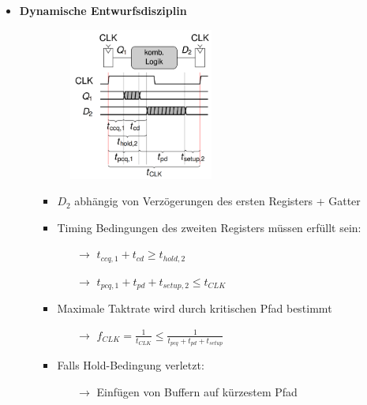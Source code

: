 \documentclass[11pt,a4paper]{article}
\begin{document}
\begin{itemize}
\item \textbf{Dynamische Entwurfsdisziplin}
	\begin{itemize}
	\item[]		
				\begin{minipage}{0.25\textwidth}
					\begin{figure}[H]
					\includegraphics[height=5cm]{Bilder/entwurfsdisziplin}
					\end{figure}
				\end{minipage}
				\begin{minipage}[t]{0.65\textwidth}
					\vspace{-2.25cm}
					\begin{itemize}
					\item $D_2$ abhängig von Verzögerungen des ersten Registers + Gatter
					\item Timing Bedingungen des zweiten Registers müssen erfüllt sein:
						\begin{itemize}
						\item[$\rightarrow$] $t_{ccq,1}+t_{cd} \geq t_{hold,2}$
						\item[$\rightarrow$] $t_{pcq,1}+t_{pd} + t_{setup,2} \leq t_{CLK}$
						\end{itemize}
					
					\item Maximale Taktrate wird durch kritischen Pfad bestimmt
						\begin{itemize}
						\item[$\rightarrow$] $f_{CLK}=\frac{1}{t_{CLK}} \leq \frac{1}{t_{pcq}+t_{pd}+t_{setup}}$
						\end{itemize}
					\item Falls Hold-Bedingung verletzt: 
						\begin{itemize}
						\item[$\rightarrow$] Einfügen von Buffern auf kürzestem Pfad
						\end{itemize}
					\end{itemize}
				\end{minipage}
	\end{itemize}
	

\end{itemize}
\end{document}
